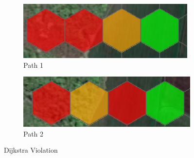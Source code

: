 \begin{figure}[h]
  \centering
  \begin{subfigure}[b]{0.4\textwidth}
    \includegraphics[width=\textwidth]{figs/Thomas/Return To Safety/cost_path_1.png}
    \caption{Path 1}
    \label{fig:path1}
  \end{subfigure}
  \hfill
  \begin{subfigure}[b]{0.4\textwidth}
    \includegraphics[width=\textwidth]{figs/Thomas/Return To Safety/cost_path_2.png}
    \caption{Path 2}
    \label{fig:path2}
  \end{subfigure}
  \caption{Dijkstra Violation}
  \label{fig:dijkstra_violation}
\end{figure}
